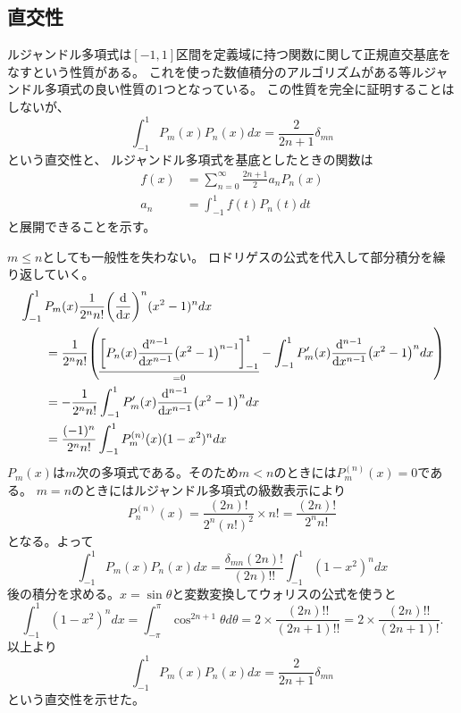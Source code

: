 \documentclass[../../master.tex]{subfiles}
\begin{document}
\subsection{直交性}
ルジャンドル多項式は\([-1, 1]\)区間を定義域に持つ関数に関して正規直交基底をなすという性質がある。
これを使った数値積分のアルゴリズムがある等ルジャンドル多項式の良い性質の1つとなっている。
この性質を完全に証明することはしないが、
\begin{equation}
	\int_{-1}^{1} P_m(x) P_n(x) dx = \frac{2}{2n+1}\delta_{mn}
\end{equation}
という直交性と、
ルジャンドル多項式を基底としたときの関数は
\begin{align}
	f(x) & = \sum_{n=0}^{\infty} \frac{2n+1}{2}a_n P_n(x) \\
	a_n  & =\int_{-1}^{1}f(t)P_n(t) dt
\end{align}
と展開できることを示す。

\(m\leq n\)としても一般性を失わない。
ロドリゲスの公式を代入して部分積分を繰り返していく。
\begin{align}
	 & \int_{-1}^{1} P_m(x) \frac{1}{2^n n!} \qty(\dv{x})^n (x^2-1)^n dx \notag \\
	 & \qquad = \frac{1}{2^n n!}
	\qty(
	\underset{=0}{\underline{
			\qty[P_n(x)\dv[n-1]{x}(x^2-1)^{n-1}]_{-1}^{1}
		}}
	- \int_{-1}^{1}P_m'(x)\dv[n-1]{x}(x^2-1)^n dx
	)                                                                           \\
	 & \qquad=-\frac{1}{2^n n!}\int_{-1}^{1}P_m'(x)\dv[n-1]{x}(x^2-1)^n dx      \\
	 & \qquad=\frac{(-1)^n}{2^n n!}\int_{-1}^{1} P_m^{(n)}(x)(1-x^2)^n dx
\end{align}
\(P_m(x)\)は\(m\)次の多項式である。そのため\(m<n\)のときには\(P_m^{(n)}(x)=0\)である。
\(m=n\)のときにはルジャンドル多項式の級数表示により
\begin{equation}
	P_n^{(n)}(x) = \frac{(2n)!}{2^n (n!)^2}\times n! = \frac{(2n)!}{2^n n!}
\end{equation}
となる。よって
\begin{equation}
	\int_{-1}^{1} P_m(x) P_n(x) dx
	= \frac{\delta_{mn}(2n)!}{(2n)!!}\int_{-1}^{1} (1-x^2)^n dx
\end{equation}
後の積分を求める。\(x=\sin\theta\)と変数変換してウォリスの公式を使うと
\begin{equation}
	\int_{-1}^{1} (1-x^2)^n dx
	= \int_{-\pi}^{\pi} \cos^{2n+1} \theta d\theta
	= 2 \times \frac{(2n)!!}{(2n+1)!!} = 2 \times \frac{(2n)!!}{(2n+1)!}.
\end{equation}
以上より
\begin{equation}
	\int_{-1}^{1} P_m(x) P_n(x) dx = \frac{2}{2n+1}\delta_{mn}
\end{equation}
という直交性を示せた。
\end{document}
